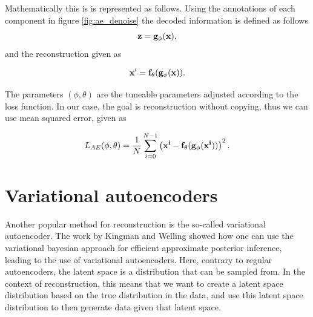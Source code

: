 Mathematically this is is represented as follows\cite{weng2018VAE}. Using the annotations of each component in figure \ref{fig:ae_denoise} the decoded information is defined as follows 
\begin{equation*}
    \bf{z} = g_{\phi}(\bf{x}),
\end{equation*}    
and the reconstruction given as 

\begin{equation*}
    \bf{x'} = f_{\theta}(g_{\phi}(\bf{x})).
\end{equation*}  

The parameters $(\phi,\theta)$ are the tuneable parameters adjusted according to the loss function. In our case, the goal is
reconstruction without copying, thus we can use mean squared error, given as 

\begin{equation}\label{eq:loss_ae}
    L_{AE} (\phi,\theta) = \frac{1}{N}\sum_{i=0}^{N-1} \left(\bf{x}^{i} - f_{\theta}(g_{\phi}(\bf{x}^{i}))\right)^{2}.
\end{equation}

\section{Variational autoencoders}
Another popular method for reconstruction is the so-called variational autoencoder. The work by Kingman and Welling \cite{VAE} showed how
one can use the variational bayesian approach for efficient approximate posterior inference, leading to the use of variational autoencoders.
Here, contrary to regular autoencoders, the latent space is a distribution that can be sampled from. In the context of reconstruction, this means that
we want to create a latent space distribution based on the true distribution in the data, and use this latent space distribution to then generate
data given that latent space. 

